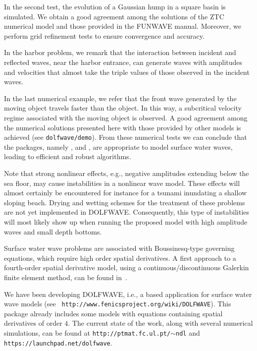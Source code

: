   In the second test, the evolution of a Gaussian hump in a
square basin is simulated.  We obtain a good agreement among
the solutions of the ZTC numerical model and those provided
in the FUNWAVE manual.  Moreover, we perform grid refinement
tests to ensure convergence and accuracy.


In the harbor problem, we
remark that the interaction between incident and reflected
waves, near the harbor entrance, can generate waves with
amplitudes and velocities that almost take the triple values
of those observed in the incident waves.

In the last
numerical example, we refer that the front wave generated by the
moving object travels faster than the object.  In this way,
a subcritical velocity regime associated with the moving
object is observed.  A good agreement among the numerical
solutions presented here with those provided by other models
is achieved (see {\tt dolfwave/demo}).  From these numerical
tests we can conclude that the \fenics packages,
namely \dolfin, \ufl and \ffc, are appropriate to model
surface water waves, leading to efficient and robust
algorithms.

Note that  strong nonlinear
effects, e.g., negative amplitudes extending below the sea floor,
may cause instabilities in a nonlinear wave model.
These effects will almost
certainly be encountered for instance for a tsunami
inundating a shallow sloping beach.
Drying and wetting schemes for the treatment of these problems are
not yet implemented in DOLFWAVE.
Consequently, this type of instabilities will most likely
show up when running the proposed model with  high amplitude
waves  and small depth bottoms.


Surface water wave problems are associated with
Boussinesq-type governing equations, which require high
order spatial derivatives. A first approach to a
fourth-order spatial derivative model, using a
continuous/discontinuous Galerkin finite element method, can
be found in~\cite{LopesPereiraTrabucho}.

We have been developing DOLFWAVE, i.e., a \fenics based
application for surface water wave models (see {\tt
http://www.fenicsproject.org/wiki/DOLFWAVE}).  This package
already includes some models with equations containing
spatial derivatives of order $4$.  The current state of the
work, along with several nume\-ri\-cal simulations, can be found
at {\tt http://ptmat.fc.ul.pt/$\sim$ndl} and {\tt
https://launchpad.net/dolfwave}.

